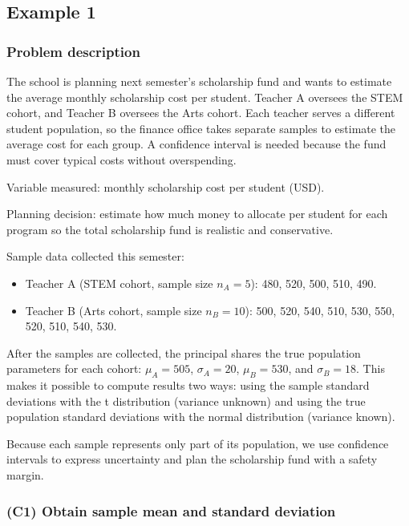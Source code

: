 \subsection{Example 1}\label{sec:interval-example1-1}

\subsubsection{Problem description}\label{subsec:interval-example1-1-problem}

The school is planning next semester's scholarship fund and wants to estimate the average monthly scholarship cost per student. Teacher A oversees the STEM cohort, and Teacher B oversees the Arts cohort. Each teacher serves a different student population, so the finance office takes separate samples to estimate the average cost for each group. A confidence interval is needed because the fund must cover typical costs without overspending.

Variable measured: monthly scholarship cost per student (USD).

Planning decision: estimate how much money to allocate per student for each program so the total scholarship fund is realistic and conservative.

Sample data collected this semester:

\begin{itemize}
	\item Teacher A (STEM cohort, sample size \(n_A = 5\)): 480, 520, 500, 510, 490.
	\item Teacher B (Arts cohort, sample size \(n_B = 10\)): 500, 520, 540, 510, 530, 550, 520, 510, 540, 530.
\end{itemize}

After the samples are collected, the principal shares the true population parameters for each cohort: \(\mu_A = 505\), \(\sigma_A = 20\), \(\mu_B = 530\), and \(\sigma_B = 18\). This makes it possible to compute results two ways: using the sample standard deviations with the t distribution (variance unknown) and using the true population standard deviations with the normal distribution (variance known).

Because each sample represents only part of its population, we use confidence intervals to express uncertainty and plan the scholarship fund with a safety margin.


\subsubsection{(C1) Obtain sample mean and standard deviation}\label{subsubsec:interval-example1-1-c1}


